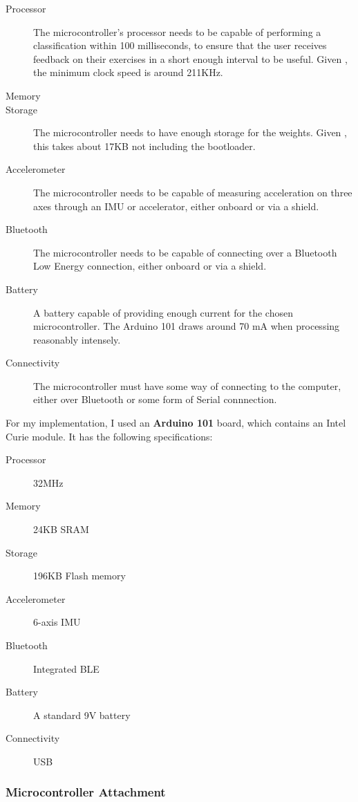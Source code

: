\documentclass[a4paper]{article}
\begin{document}
\begin{description}
\item[Processor] The microcontroller's processor needs to be capable of performing a classification within 100 milliseconds, to ensure that the user receives feedback on their exercises in a short enough interval to be useful. Given , the minimum clock speed is around 211KHz.\cite{dsref0}
\item[Memory] 
\item[Storage] The microcontroller needs to have enough storage for the weights. Given , this takes about 17KB not including the bootloader\cite{dsref2}.
\item[Accelerometer] The microcontroller needs to be capable of measuring acceleration on three axes through an IMU or accelerator, either onboard or via a shield.
\item[Bluetooth] The microcontroller needs to be capable of connecting over a Bluetooth Low Energy connection, either onboard or via a shield.
\item[Battery] A battery capable of providing enough current for the chosen microcontroller. The Arduino 101 draws around 70 mA when processing reasonably intensely.\cite{dsref3}
\item[Connectivity] The microcontroller must have some way of connecting to the computer, either over Bluetooth or some form of Serial connnection.
\end{description}

For my implementation, I used an \textbf{Arduino 101} board, which contains an Intel Curie module. It has the following specifications:\cite{dsref4}

\begin{description}
\item[Processor] 32MHz
\item[Memory] 24KB SRAM
\item[Storage] 196KB Flash memory
\item[Accelerometer] 6-axis IMU
\item[Bluetooth] Integrated BLE 
\item[Battery] A standard 9V battery
\item[Connectivity] USB
\end{description}


\subsubsection{Microcontroller Attachment}
\end{document}
